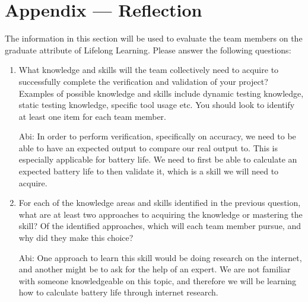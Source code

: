 \documentclass[12pt, titlepage]{article}
\begin{document}
\newpage{}
\section*{Appendix --- Reflection}

The information in this section will be used to evaluate the team members on the
graduate attribute of Lifelong Learning.  Please answer the following questions:

\begin{enumerate}
  \item What knowledge and skills will the team collectively need to acquire to
  successfully complete the verification and validation of your project?
  Examples of possible knowledge and skills include dynamic testing knowledge,
  static testing knowledge, specific tool usage etc.  You should look to
  identify at least one item for each team member.

Abi: In order to perform verification, specifically on accuracy, we need to be able to have an expected output to compare our real output to. This is especially applicable for battery life. We need to first be able to calculate an expected battery life to then validate it, which is a skill we will need to acquire. 


  \item For each of the knowledge areas and skills identified in the previous
  question, what are at least two approaches to acquiring the knowledge or
  mastering the skill?  Of the identified approaches, which will each team
  member pursue, and why did they make this choice?

Abi: One approach to learn this skill would be doing research on the internet, and another might be to ask for the help of an expert. We are not familiar with someone knowledgeable on this topic, and therefore we will be learning how to calculate battery life through internet research. 

\end{enumerate}
\end{document}
